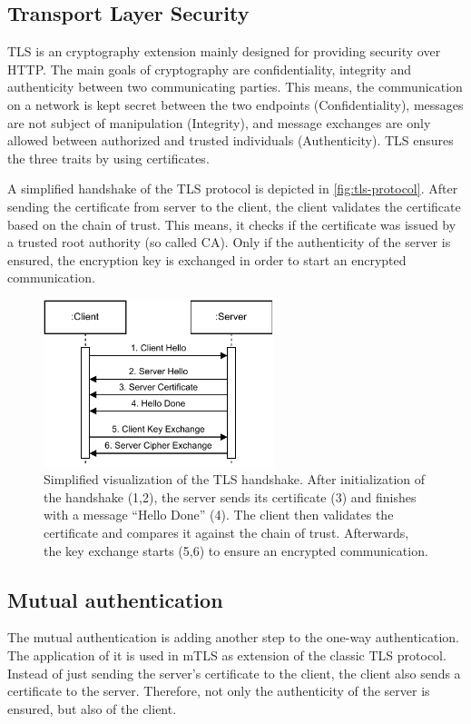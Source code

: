 \subsection{Transport Layer Security}
\ac{TLS} is an cryptography extension mainly designed for providing security over \ac{HTTP}. The main goals of cryptography are confidentiality, integrity and authenticity between two communicating parties. This means, the communication on a network is kept secret between the two endpoints (Confidentiality), messages are not subject of manipulation (Integrity), and message exchanges are only allowed between authorized and trusted individuals (Authenticity). \ac{TLS} ensures the three traits by using certificates.

A simplified handshake of the \ac{TLS} protocol is depicted in \autoref{fig:tls-protocol}.
After sending the certificate from server to the client, the client validates the certificate based on the chain of trust. This means, it checks if the certificate was issued by a trusted root authority (so called \ac{CA}). Only if the authenticity of the server is ensured, the encryption key is exchanged in order to start an encrypted communication.

\begin{figure}[ht]
	\centering
	\includegraphics[width=0.6\textwidth]{Figures/tls.pdf}
	\caption{Simplified visualization of the \ac{TLS} handshake\cite{Rescorla.2018}. After initialization of the handshake (1,2), the server sends its certificate (3) and finishes with a message \enquote{Hello Done} (4). The client then validates the certificate and compares it against the chain of trust. Afterwards, the key exchange starts (5,6) to ensure an encrypted communication.}
	\label{fig:tls-protocol}
\end{figure}


\subsection{Mutual authentication}
The mutual authentication is adding another step to the one-way authentication. The application of it is used in \ac{mTLS} as extension of the classic \ac{TLS} protocol\cite{Rescorla.2018, HugoKrawczyk.2016}. Instead of just sending the server's certificate to the client, the client also sends a certificate to the server. Therefore, not only the authenticity of the server is ensured, but also of the client.

